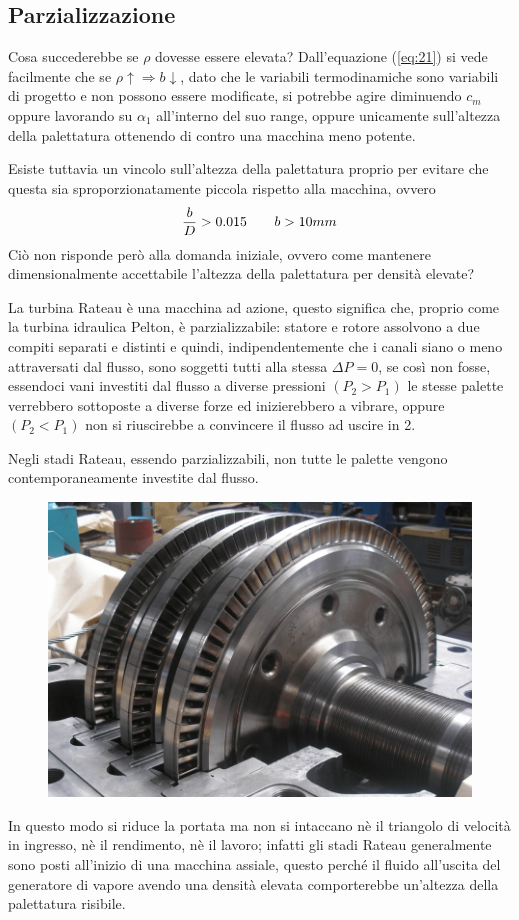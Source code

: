 \documentclass[a4paper, 15pt]{article}
\begin{document}
\subsection{Parzializzazione}
\begin{adjustwidth}{2in}{}
	Cosa succederebbe se $\rho$ dovesse essere elevata? Dall'equazione (\ref{eq:21}) si vede facilmente che se $\rho\uparrow \Rightarrow b\downarrow$, dato che le variabili termodinamiche sono variabili di progetto e non possono essere modificate, si potrebbe agire diminuendo $c_m$ oppure lavorando su $\alpha_1$ all'interno del suo range, oppure unicamente sull'altezza della palettatura ottenendo di contro una macchina meno potente.\newline 
	
	Esiste tuttavia un vincolo sull'altezza della palettatura proprio per evitare che questa sia sproporzionatamente piccola rispetto alla macchina, ovvero 
	\[{b\over D}>0.015\qquad b>10mm\]
	Ciò non risponde però alla domanda iniziale, ovvero come mantenere dimensionalmente accettabile l'altezza della palettatura per densità elevate? 
	
	La turbina Rateau è una macchina ad azione, questo significa che, proprio come la turbina idraulica Pelton, è parzializzabile: statore e rotore assolvono a due compiti separati e distinti e quindi, indipendentemente che i canali siano o meno attraversati dal flusso, sono soggetti tutti alla stessa $\Delta P=0$, se così non fosse, essendoci vani investiti dal flusso a diverse pressioni $(P_2>P_1)$ le stesse palette verrebbero sottoposte a diverse forze ed inizierebbero a vibrare, oppure $(P_2<P_1)$ non si riuscirebbe a convincere il flusso ad uscire in 2.
	
	Negli stadi Rateau, essendo parzializzabili, non tutte le palette vengono contemporaneamente investite dal flusso.
\begin{figure} [H]
	\centering
	\includegraphics[width=0.5\linewidth]{immagini/Rat2}
	\label{fig:rat2}
\end{figure}
	In questo modo si riduce la portata ma non si intaccano nè il triangolo di velocità in ingresso, nè il rendimento, nè il lavoro; infatti gli stadi Rateau generalmente sono posti all'inizio di una macchina assiale, questo perché il fluido all'uscita del generatore di vapore avendo una densità elevata comporterebbe un'altezza della palettatura risibile.
	\end{adjustwidth}
\end{document}
